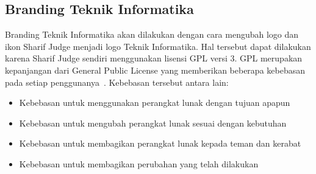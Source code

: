\subsection{Branding Teknik Informatika}
Branding Teknik Informatika akan dilakukan dengan cara mengubah logo dan ikon Sharif Judge menjadi logo Teknik Informatika. Hal tersebut dapat dilakukan karena Sharif Judge sendiri menggunakan lisensi GPL versi 3. GPL merupakan kepanjangan dari General Public License yang memberikan beberapa kebebasan pada setiap penggunanya~\cite{brett:10:moss}.
Kebebasan tersebut antara lain:
	\begin{itemize}
		\item Kebebasan untuk menggunakan perangkat lunak dengan tujuan apapun \\
		\item Kebebasan untuk mengubah perangkat lunak sesuai dengan kebutuhan \\
		\item Kebebasan untuk membagikan perangkat lunak kepada teman dan kerabat \\
		\item Kebebasan untuk membagikan perubahan yang telah dilakukan
	\end{itemize}
